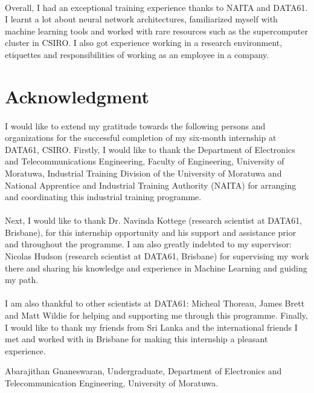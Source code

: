 \paragraph{}
Overall, I had an exceptional training experience thanks to NAITA and DATA61. I learnt a lot about neural network architectures, familiarized myself with machine learning tools and worked with rare resources such as the supercomputer cluster in CSIRO. I also got experience working in a research environment, etiquettes and responsibilities of working as an employee in a company. 

\newpage
\section*{Acknowledgment}

\paragraph{}
I would like to extend my gratitude towards the following persons and organizations for the successful completion of my six-month internship at DATA61, CSIRO. Firstly, I would like to thank the Department of Electronics and Telecommunications Engineering, Faculty of Engineering, University of Moratuwa, Industrial Training
Division of the University of Moratuwa and National Apprentice and Industrial Training Authority (NAITA) for
arranging and coordinating this industrial training programme. 

\paragraph{}
Next, I would like to thank Dr. Navinda Kottege (research scientist at DATA61, Brisbane), for this internship opportunity and his support and assistance prior and throughout the programme. I am also greatly indebted to my supervisor: Nicolas Hudson (research scientist at DATA61, Brisbane) for supervising my work there and sharing his knowledge and experience in Machine Learning and guiding my path.

\paragraph{}
I am also thankful to other scientists at DATA61: Micheal Thoreau, James Brett and Matt Wildie for helping and supporting me through this programme. Finally, I would like to thank my friends from Sri Lanka and the international friends I met and worked with in Brisbane for making this internship a pleasant experience.

\vspace*{3cm}

\noindent Abarajithan Gnaneswaran,\newline
Undergraduate,\newline
Department of Electronics and Telecommunication Engineering,\newline
University of Moratuwa.